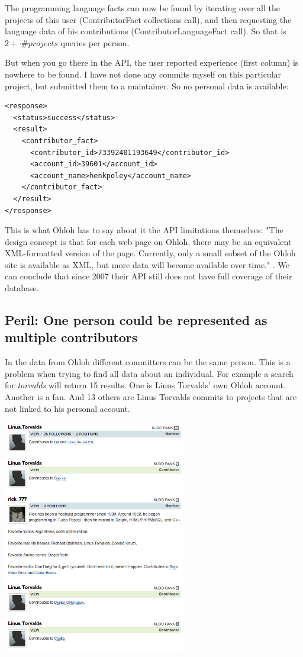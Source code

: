 \documentclass{sig-alternate}
\begin{document}
The programming language facts can now be found by iterating over all the projects of this user (ContributorFact collections call), and then requesting the language data of his contributions (ContributorLanguageFact call). So that is $2 + \cdot \#projects$ queries per person.

But when you go there in the API, the user reported experience (first column) is nowhere to be found. I have not done any commits myself on this particular project, but submitted them to a maintainer. So no personal data is available:

\begin{lstlisting}
<response> 
  <status>success</status> 
  <result> 
    <contributor_fact> 
      <contributor_id>73392401193649</contributor_id> 
      <account_id>39601</account_id> 
      <account_name>henkpoley</account_name> 
    </contributor_fact> 
  </result> 
</response> 
\end{lstlisting}

This is what Ohloh has to say about it the API limitations themselves: "The design concept is that for each web page on Ohloh, there may be an equivalent XML-formatted version of the page. Currently, only a small subset of the Ohloh site is available as XML, but more data will become available over time." \cite{ohloh-api}. We can conclude that since 2007 their API still does not have full coverage of their database.

\subsection{Peril: One person could be represented as multiple contributors}\label{need-smushing}

In the data from Ohloh different committers can be the same person. This is a problem when trying to find all data about an individual. For example a search for \emph{torvalds} will return 15 results. One is Linus Torvalds' own Ohloh account. Another is a fan. And 13 others are Linus Torvalds commits to projects that are not linked to his personal account.

\includegraphics[width=80mm]{TorvaldsSearch.png}
\end{document}
